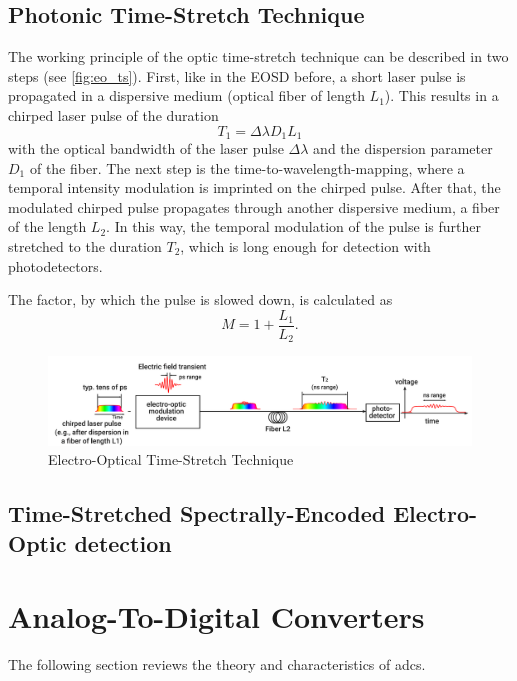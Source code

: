\subsection{Photonic Time-Stretch Technique}
The working principle of the optic time-stretch technique can be described in two steps (see \autoref{fig:eo_ts}).
First, like in the EOSD before, a short laser pulse is propagated in a dispersive medium (optical fiber of length $L_1$). %
This results in a chirped laser pulse of the duration
\begin{equation}
	T_1 = \Delta \lambda D_1 L_1
\end{equation}
with the optical bandwidth of the laser pulse $\Delta \lambda$  and the dispersion parameter $D_1$ of the fiber.
The next step is the time-to-wavelength-mapping, where a temporal intensity modulation is imprinted on the chirped pulse.
After that, the modulated chirped pulse propagates through another dispersive medium, a fiber of the length $L_2$.
In this way, the temporal modulation of the pulse is further stretched to the duration $T_2$, which is long enough for detection with photodetectors. \cite{roussel2014}

The factor, by which the pulse is slowed down, is calculated as
\begin{equation}
	M = 1 + \frac{L_1}{L_2}.
\end{equation}

\begin{figure}[tbh]
	\centering
	\includegraphics[width = \textwidth]{chap/02-theory/img/time_stretch.png}
	\caption{Electro-Optical Time-Stretch Technique \cite{szwaj}}
	\label{fig:eo_ts}
\end{figure}

\subsection{Time-Stretched Spectrally-Encoded Electro-Optic detection}





\newpage
\section{Analog-To-Digital Converters}
The following section reviews the theory and characteristics of \glspl{adc}. %

